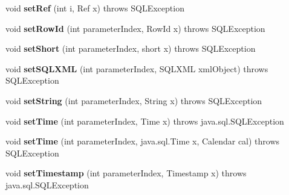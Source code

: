 \begin{DoxyCompactItemize}
void {\bfseries set\+Ref} (int i, Ref x)  throws S\+Q\+L\+Exception 
\item 
\mbox{\label{classcom_1_1mysql_1_1cj_1_1jdbc_1_1_client_prepared_statement_a32f20ad87d972d4280b8a73619cd20a6}} 
void {\bfseries set\+Row\+Id} (int parameter\+Index, Row\+Id x)  throws S\+Q\+L\+Exception 
\item 
\mbox{\label{classcom_1_1mysql_1_1cj_1_1jdbc_1_1_client_prepared_statement_a250604d8af34d3a9552b2bb59dac755f}} 
void {\bfseries set\+Short} (int parameter\+Index, short x)  throws S\+Q\+L\+Exception 
\item 
\mbox{\label{classcom_1_1mysql_1_1cj_1_1jdbc_1_1_client_prepared_statement_a50024c63a48c0c29dc59d93f6e850524}} 
void {\bfseries set\+S\+Q\+L\+X\+ML} (int parameter\+Index, S\+Q\+L\+X\+ML xml\+Object)  throws S\+Q\+L\+Exception 
\item 
\mbox{\label{classcom_1_1mysql_1_1cj_1_1jdbc_1_1_client_prepared_statement_a17c72582ab7d937c28e2df3a6c4f9777}} 
void {\bfseries set\+String} (int parameter\+Index, String x)  throws S\+Q\+L\+Exception 
\item 
\mbox{\label{classcom_1_1mysql_1_1cj_1_1jdbc_1_1_client_prepared_statement_af9130888af4f80965d74ca5617cd374c}} 
void {\bfseries set\+Time} (int parameter\+Index, Time x)  throws java.\+sql.\+S\+Q\+L\+Exception 
\item 
\mbox{\label{classcom_1_1mysql_1_1cj_1_1jdbc_1_1_client_prepared_statement_a9cc08b12315d4c502e3fae7692e6af47}} 
void {\bfseries set\+Time} (int parameter\+Index, java.\+sql.\+Time x, Calendar cal)  throws S\+Q\+L\+Exception 
\item 
\mbox{\label{classcom_1_1mysql_1_1cj_1_1jdbc_1_1_client_prepared_statement_a34d40f7444292106d7853d49ad2eb5af}} 
void {\bfseries set\+Timestamp} (int parameter\+Index, Timestamp x)  throws java.\+sql.\+S\+Q\+L\+Exception 

\end{DoxyCompactItemize}
